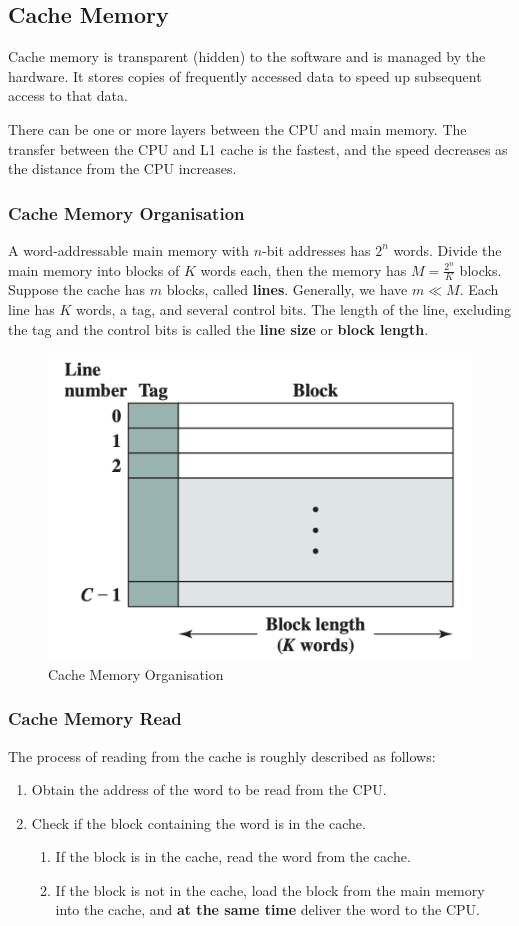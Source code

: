 \subsection{Cache Memory}

Cache memory is transparent (hidden) to the software and is managed by the hardware.
It stores copies of frequently accessed data to speed up subsequent access to that data.

There can be one or more layers between the CPU and main memory.
The transfer between the CPU and L1 cache is the fastest, and the speed decreases
as the distance from the CPU increases.

\subsubsection{Cache Memory Organisation}

A word-addressable main memory with $n$-bit addresses has $2^n$ words. Divide the
main memory into blocks of $K$ words each, then the memory has $M=\frac{2^n}{K}$ blocks.
Suppose the cache has $m$ blocks, called \textbf{lines}. Generally, we have $m \ll M$.
Each line has $K$ words, a tag, and several control bits. The length of the line,
excluding the tag and the control bits is called the \textbf{line size} or
\textbf{block length}.

\begin{figure}[H]
\centering
\includegraphics[width=0.4\linewidth]{chaps/memory/cache-memory/cache-mem-organisation.png}
\caption{Cache Memory Organisation}
\end{figure}

\subsubsection{Cache Memory Read}

The process of reading from the cache is roughly described as follows:
\begin{enumerate}
    \item Obtain the address of the word to be read from the CPU.
    \item Check if the block containing the word is in the cache.
    \begin{enumerate}
        \item If the block is in the cache, read the word from the cache.
        \item If the block is not in the cache, load the block from the main memory
            into the cache, and \textbf{at the same time} deliver the word to the CPU.
    \end{enumerate}
\end{enumerate}

